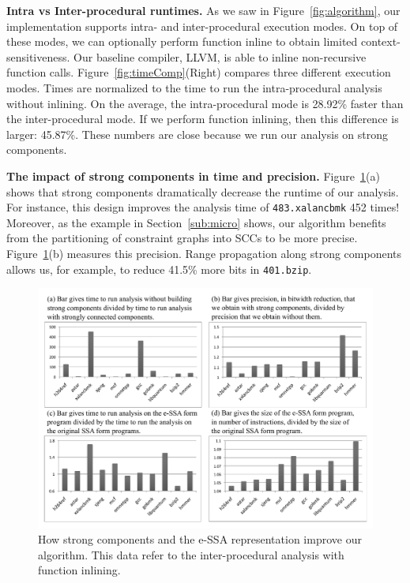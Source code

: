 \documentclass{llncs}
\begin{document}
\noindent
\textbf{Intra vs Inter-procedural runtimes.}
As we saw in Figure~\ref{fig:algorithm}, our implementation supports
intra- and inter-procedural execution modes.
On top of these modes, we can optionally perform function inline to obtain
limited context-sensitiveness.
Our baseline compiler, LLVM, is able to inline non-recursive function calls.
Figure~\ref{fig:timeComp}(Right) compares three different execution modes.
Times are normalized to the time to run the intra-procedural analysis
without inlining.
On the average, the intra-procedural mode is 28.92\% faster than the
inter-procedural mode.
If we perform function inlining, then this difference is larger: 45.87\%.
These numbers are close because we run our analysis on strong components.

\noindent
\textbf{The impact of strong components in time and precision.}
Figure~\ref{fig:impactEssaSCC}(a) shows that strong components dramatically
decrease the runtime of our analysis.
For instance, this design improves the analysis time of \texttt{483.xalancbmk}
452 times!
Moreover, as the example in Section~\ref{sub:micro} shows, our algorithm benefits
from the partitioning of constraint graphs into SCCs to be more precise.
Figure~\ref{fig:impactEssaSCC}(b) measures this precision.
Range propagation along strong components allows us, for example, to reduce
41.5\% more bits in \texttt{401.bzip}.

\begin{figure}[t!]
\begin{center}
\includegraphics[width=\textwidth]{images/impactEssaSCC}
\end{center}
\caption{\label{fig:impactEssaSCC}
How strong components and the e-SSA representation improve our algorithm.
This data refer to the inter-procedural analysis with function inlining.
}
\end{figure}
\end{document}
